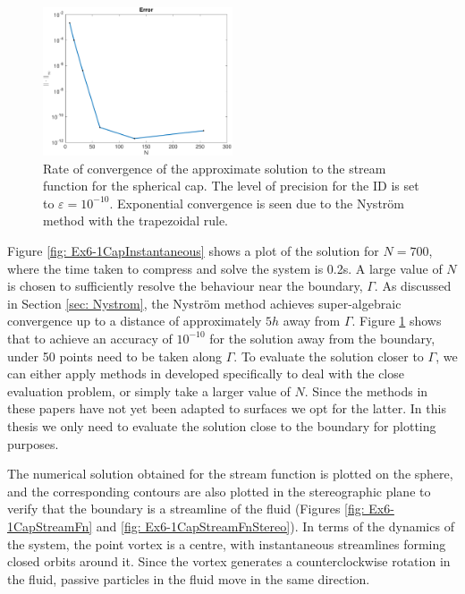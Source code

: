 \documentclass{sfuthesis}
\begin{document}
\begin{figure}[h]
	\centering
 	\includegraphics[width=0.5\textwidth]{Ex6-1CapError}
	\caption{Rate of convergence of the approximate solution to the stream function for the spherical cap. The level of precision for the ID is set to $\varepsilon=10^{-10}$. Exponential convergence is seen due to the Nystr\"{o}m method with the trapezoidal rule. }  
	\label{fig: Ex6-1CapError}
\end{figure}

Figure \ref{fig: Ex6-1CapInstantaneous} shows a plot of the solution for $N=700$, where the time taken to compress and solve the system is 0.2s. A large value of $N$ is chosen to sufficiently resolve the behaviour near the boundary, $\Gamma$. As discussed in Section \ref{sec: Nystrom}, the Nystr\"{o}m method achieves super-algebraic convergence up to a distance of approximately $5h$ away from $\Gamma$. Figure \ref{fig: Ex6-1CapError} shows that to achieve an accuracy of $10^{-10}$ for the solution away from the boundary, under 50 points need to be taken along $\Gamma$. To evaluate the solution closer to $\Gamma$, we can either apply methods in \cite{Barn14, Klock13, Hels08} developed specifically to deal with the close evaluation problem, or simply take a larger value of $N$. Since the methods in these papers have not yet been adapted to surfaces we opt for the latter. In this thesis we only need to evaluate the solution close to the boundary for plotting purposes. 

The numerical solution obtained for the stream function is plotted on the sphere, and the corresponding contours are also plotted in the stereographic plane to verify that the boundary is  a streamline of the fluid (Figures \ref{fig: Ex6-1CapStreamFn} and \ref{fig: Ex6-1CapStreamFnStereo}). In terms of the dynamics of the system, the point vortex is a centre, with instantaneous streamlines forming closed orbits around it. Since the vortex generates a counterclockwise rotation in the fluid, passive particles in the fluid move in the same direction.
 
\end{document}
